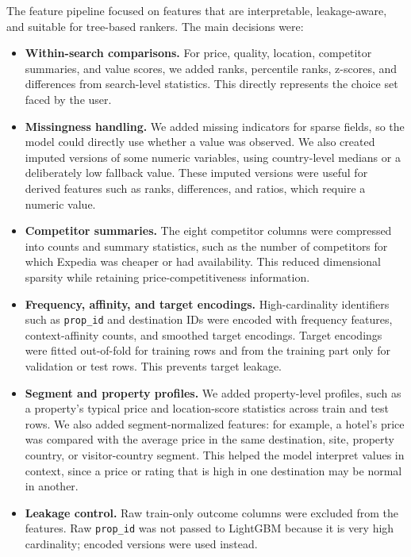 \documentclass[runningheads]{llncs}
\begin{document}
The feature pipeline focused on features that are interpretable, leakage-aware, and suitable for tree-based rankers.  The main decisions were:

\begin{itemize}
\item \textbf{Within-search comparisons.} For price, quality, location, competitor summaries, and value scores, we added ranks, percentile ranks, z-scores, and differences from search-level statistics.  This directly represents the choice set faced by the user.
\item \textbf{Missingness handling.} We added missing indicators for sparse fields, so the model could directly use whether a value was observed.  We also created imputed versions of some numeric variables, using country-level medians or a deliberately low fallback value.  These imputed versions were useful for derived features such as ranks, differences, and ratios, which require a numeric value.
\item \textbf{Competitor summaries.} The eight competitor columns were compressed into counts and summary statistics, such as the number of competitors for which Expedia was cheaper or had availability.  This reduced dimensional sparsity while retaining price-competitiveness information.
\item \textbf{Frequency, affinity, and target encodings.} High-cardinality identifiers such as \texttt{prop\_id} and destination IDs were encoded with frequency features, context-affinity counts, and smoothed target encodings.  Target encodings were fitted out-of-fold for training rows and from the training part only for validation or test rows.  This prevents target leakage.
\item \textbf{Segment and property profiles.} We added property-level profiles, such as a property's typical price and location-score statistics across train and test rows.  We also added segment-normalized features: for example, a hotel's price was compared with the average price in the same destination, site, property country, or visitor-country segment.  This helped the model interpret values in context, since a price or rating that is high in one destination may be normal in another.
\item \textbf{Leakage control.} Raw train-only outcome columns were excluded from the features.  Raw \texttt{prop\_id} was not passed to LightGBM because it is very high cardinality; encoded versions were used instead.
\end{itemize}
\end{document}
